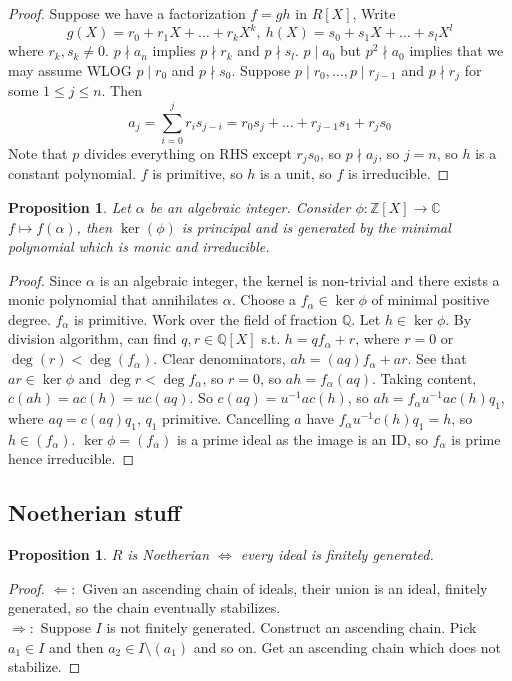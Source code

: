 \documentclass{article}
\theoremstyle{definition}
\theoremstyle{remark}
\theoremstyle{plain}
\newtheorem{prop}[defn]{Proposition}
\theoremstyle{definition}
\newcommand{\ZZ}{\mathbb{Z}}
\newcommand{\QQ}{\mathbb{Q}}
\newcommand{\CC}{\mathbb{C}}
\begin{document}
\begin{proof}
Suppose we have a factorization $f=gh$ in $R[X]$, Write
\[g(X)=r_0+r_1X+\ldots+r_kX^k,\ h(X)=s_0+s_1X+\ldots+s_lX^l\]
where $r_k,s_k\neq0$. $p\nmid a_n$ implies $p\nmid r_k$ and $p\nmid s_l$. $p\mid a_0$ but $p^2\nmid a_0$ implies that we may assume WLOG $p\mid r_0$ and $p\nmid s_0$. Suppose $p\mid r_0,\ldots, p\mid r_{j-1}$ and $p\nmid r_j$ for some $1\le j\le n$. Then $$a_j=\sum_{i=0}^j r_is_{j-i}=r_0s_j+...+r_{j-1}s_1+r_js_0$$
Note that $p$ divides everything on RHS except $r_js_0$, so $p\nmid a_j$, so $j=n$, so $h$ is a constant polynomial. $f$ is primitive, so $h$ is a unit, so $f$ is irreducible.
\end{proof}
\begin{prop}
    Let $\alpha$ be an algebraic integer. Consider $\phi:\ZZ[X]\to \CC$ $f\mapsto f(\alpha)$, then $\ker(\phi)$ is principal and is generated by the minimal polynomial which is monic and irreducible.
\end{prop}
\begin{proof}
    Since $\alpha$ is an algebraic integer, the kernel is non-trivial and there exists a monic polynomial that annihilates $\alpha$. Choose a $f_\alpha\in \ker\phi$ of minimal positive degree. $f_\alpha$ is primitive. Work over the field of fraction $\QQ$. Let $h\in \ker\phi$. By division algorithm, can find $q,r\in \QQ[X]$ s.t. $h=qf_{\alpha}+r$, where $r=0$ or $\deg(r)<\deg(f_\alpha)$. Clear denominators, $ah=(aq)f_\alpha+ar$. See that $ar\in \ker\phi$ and $\deg r<\deg f_\alpha$, so $r=0$, so $ah=f_\alpha(aq)$.
    Taking content, $c(ah)=ac(h)=uc(aq)$. So $c(aq)=u^{-1}ac(h)$, so $ah=f_{\alpha}u^{-1}ac(h)q_1$, where $aq=c(aq)q_1$, $q_1$ primitive. Cancelling $a$ have $f_\alpha u^{-1}c(h)q_1=h$, so $h\in (f_\alpha)$. $\ker\phi=(f_\alpha)$ is a prime ideal as the image is an ID, so $f_\alpha$ is prime hence irreducible.
\end{proof}
\subsection{Noetherian stuff}
\begin{prop}
    $R$ is Noetherian $\Leftrightarrow$ every ideal is finitely generated.
\end{prop}
\begin{proof}
    $\Leftarrow:$ Given an ascending chain of ideals, their union is an ideal, finitely generated, so the chain eventually stabilizes.\\
    $\Rightarrow:$ Suppose $I$ is not finitely generated. Construct an ascending chain. Pick $a_1\in I$ and then $a_2\in I\setminus(a_1)$ and so on. Get an ascending chain which does not stabilize.
\end{proof}
\end{document}
